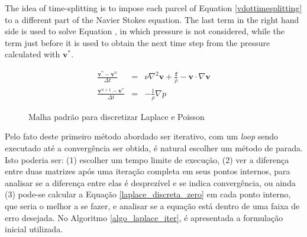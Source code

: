 \documentclass[journal]{IEEEtran}
\begin{document}
The idea of time-splitting is to impose each parcel of Equation \ref{vdottimesplitting} to a different part of the Navier Stokes equation. The last term in the right hand side is used to solve Equation \label{equacaovestrela}, in which pressure is not considered, while the term just before it is used to obtain the next time step from the pressure calculated with $\mathbf{v}^{*}$.

\begin{eqnarray}
\frac{\textbf{v}^{*}-\textbf{v}^n}{\Delta t}&=& \nu\nabla ^2 \textbf{v} + \frac{\textbf{f}}{\rho} - \textbf{v}\cdot \nabla \textbf{v}\label{equacaovestrela}\\
\frac{\textbf{v}^{n+1}-\textbf{v}^*}{\Delta t}&=&-\frac{1}{\rho}\nabla p\label{equacaoprepressao}
\end{eqnarray}




\begin{figure}[!ht]
\centering
{}
\caption{Malha padrão para discretizar Laplace e Poisson\label{malha_poisson}}
\end{figure}


Pelo fato deste primeiro método abordado ser iterativo, com um \textit{loop} sendo executado até a convergência ser obtida, é natural escolher um método de parada. Isto poderia ser: (1) escolher um tempo limite de execução, (2) ver a diferença entre duas matrizes após uma iteração completa em seus pontos internos, para analisar se a diferença entre elas é desprezível e se indica convergência, ou ainda (3) pode-se calcular a Equação \ref{laplace_discreta_zero} em cada ponto interno, que seria o melhor a se fazer, e analisar se a equação está dentro de uma faixa de erro desejada. No Algoritmo \ref{algo_laplace_iter}, é apresentada a formulação inicial utilizada.
\end{document}
